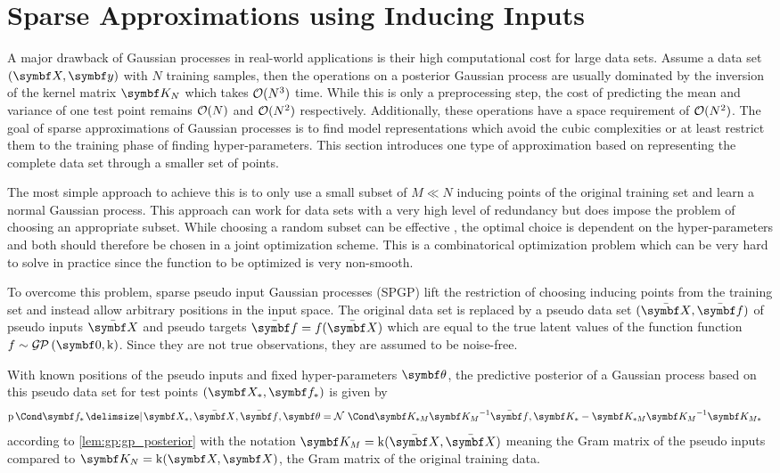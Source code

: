 \section{Sparse Approximations using Inducing Inputs}
A major drawback of Gaussian processes in real-world applications is their high computational cost for large data sets.
Assume a data set $(\mat{X}, \mat{y})$ with $N$ training samples, then the operations on a posterior Gaussian process are usually dominated by the inversion of the kernel matrix $\mat{K_N}$ which takes $\operatorname{\mathcal{O}}(N^3)$ time.
While this is only a preprocessing step, the cost of predicting the mean and variance of one test point remains $\operatorname{\mathcal{O}}(N)$ and $\operatorname{\mathcal{O}}(N^2)$ respectively.
Additionally, these operations have a space requirement of $\operatorname{\mathcal{O}}(N^2)$.
The goal of sparse approximations of Gaussian processes is to find model representations which avoid the cubic complexities or at least restrict them to the training phase of finding hyper-parameters.
This section introduces one type of approximation based on representing the complete data set through a smaller set of points.

The most simple approach to achieve this is to only use a small subset of $M \ll N$ inducing points of the original training set and learn a normal Gaussian process.
This approach can work for data sets with a very high level of redundancy but does impose the problem of choosing an appropriate subset.
While choosing a random subset can be effective \cite{snelson_flexible_2007}, the optimal choice is dependent on the hyper-parameters and both should therefore be chosen in a joint optimization scheme.
This is a combinatorical optimization problem which can be very hard to solve in practice since the function to be optimized is very non-smooth.

To overcome this problem, sparse pseudo input Gaussian processes (SPGP) \cite{snelson_flexible_2007} lift the restriction of choosing inducing points from the training set and instead allow arbitrary positions in the input space.
The original data set is replaced by a pseudo data set $(\ps{\mat{X}}, \ps{\mat{f}})$ of pseudo inputs $\ps{\mat{X}}$ and pseudo targets $\ps{\mat{f}} = f(\ps{\mat{X}})$ which are equal to the true latent values of the function function $f \sim \GP(\mat{0}, \K)$.
Since they are not true observations, they are assumed to be noise-free.

With known positions of the pseudo inputs and fixed hyper-parameters $\mat{\theta}$, the predictive posterior of a Gaussian process based on this pseudo data set for test points $(\mat{X_\ast}, \mat{f_\ast})$ is given by
\begin{align}
    \Prob{\mat{f_\ast} \given \mat{X_\ast}, \ps{\mat{X}}, \ps{\mat{f}}, \mat{\theta}} & = \Gaussian{\mat{K_{\ast M}}\mat{K_M}^{-1} \ps{\mat{f}}, \mat{K_\ast} - \mat{K_{\ast M}} \mat{K_M}^{-1} \mat{K_{M \ast}}}
\end{align}
according to \cref{lem:gp:gp_posterior} with the notation $\mat{K_M} = \K(\ps{\mat{X}}, \ps{\mat{X}})$ meaning the Gram matrix of the pseudo inputs compared to $\mat{K_N} = \K(\mat{X}, \mat{X})$, the Gram matrix of the original training data.

